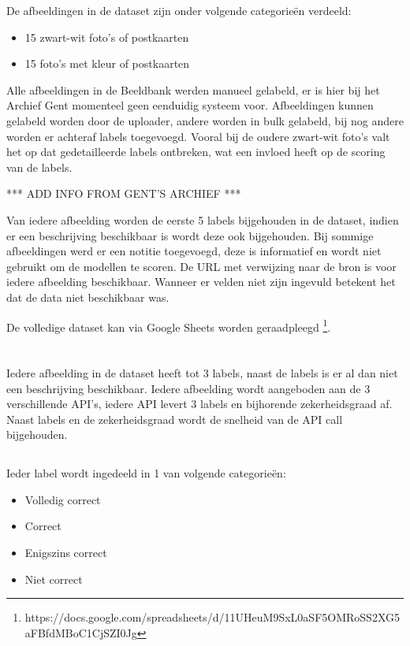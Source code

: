 De afbeeldingen in de dataset zijn onder volgende categorieën verdeeld:
\begin{itemize}
    \item 15 zwart-wit foto's of postkaarten
    \item 15 foto's met kleur of postkaarten
\end{itemize}

Alle afbeeldingen in de Beeldbank werden manueel gelabeld, er is hier bij het Archief Gent momenteel geen eenduidig systeem voor. Afbeeldingen kunnen gelabeld worden door de uploader, andere worden in bulk gelabeld, bij nog andere worden er achteraf labels toegevoegd. Vooral bij de oudere zwart-wit foto's valt het op dat gedetailleerde labels ontbreken, wat een invloed heeft op de scoring van de labels.

*** ADD INFO FROM GENT'S ARCHIEF ***

Van iedere afbeelding worden de eerste 5 labels bijgehouden in de dataset, indien er een beschrijving beschikbaar is wordt deze ook bijgehouden. Bij sommige afbeeldingen werd er een notitie toegevoegd, deze is informatief en wordt niet gebruikt om de modellen te scoren. De URL met verwijzing naar de bron is voor iedere afbeelding beschikbaar. Wanneer er velden niet zijn ingevuld betekent het dat de data niet beschikbaar was. 

De volledige dataset kan via Google Sheets worden geraadpleegd \footnote{https://docs.google.com/spreadsheets/d/11UHeuM9SxL0aSF5OMRoSS2XG5aFBfdMBoC1CjSZI0Jg}.

\section{}
\label{sec:scoren-van-computer-vision}
Iedere afbeelding in de dataset heeft tot 3 labels, naast de labels is er al dan niet een beschrijving beschikbaar. Iedere afbeelding wordt aangeboden aan de 3 verschillende API's, iedere API levert 3 labels en bijhorende zekerheidsgraad af. Naast labels en de zekerheidsgraad wordt de snelheid van de API call bijgehouden.

\subsection{}
\label{sec:scoren-van-labels}
Ieder label wordt ingedeeld in 1 van volgende categorieën:
\begin{itemize}
    \item Volledig correct
    \item Correct
    \item Enigszins correct
    \item Niet correct
\end{itemize}

